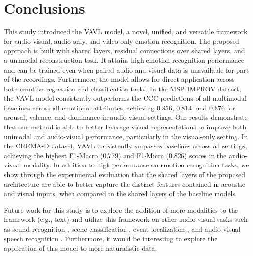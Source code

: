 \documentclass{article}
\begin{document}
\section{Conclusions}
\label{sec:conclusion}

This study introduced the VAVL model, a novel, unified, and versatile framework for audio-visual, audio-only, and video-only emotion recognition. The proposed approach is built with shared layers, residual connections over shared layers, and a unimodal reconstruction task. It attains high emotion recognition performance and can be trained even when paired audio and visual data is unavailable for part of the recordings. Furthermore, the model allows for direct application across both emotion regression and classification tasks. In the MSP-IMPROV dataset, the VAVL model consistently outperforms the CCC predictions of all multimodal baselines across all emotional attributes, achieving 0.856, 0.814, and 0.876 for arousal, valence, and dominance in audio-visual settings. Our results demonstrate that our method is able to better leverage visual representations to improve both unimodal and audio-visual performance, particularly in the visual-only setting. In the CREMA-D dataset, VAVL consistently surpasses baselines across all settings, achieving the highest F1-Macro (0.779) and F1-Micro (0.826) scores in the audio-visual modality. In addition to high performance on emotion recognition tasks, we show through the experimental evaluation that the shared layers of the proposed architecture are able to better capture the distinct features contained in acoustic and visual inputs, when compared to the shared layers of the baseline models.


Future work for this study is to explore the addition of more modalities to the framework (e.g., text) and utilize this framework on other audio-visual tasks such as sound recognition \cite{chen_2020_4}, scene classification \cite{wang_2021_3}, event localization \cite{tian_2018}, and audio-visual speech recognition \cite{Tao_2021,Tao_2018_2}. Furthermore, it would be interesting to explore the application of this model to more naturalistic data.


  
  
\end{document}
